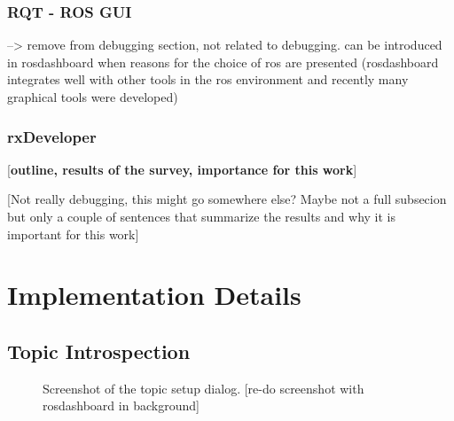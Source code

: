 \subsubsection{RQT - ROS GUI}
--> remove from debugging section, not related to debugging. can be introduced in rosdashboard when reasons for the choice of ros are presented (rosdashboard integrates well with other tools in the ros environment and recently many graphical tools were developed)

\subsubsection{rxDeveloper}
[\textbf{outline, results of the survey, importance for this work}]
\cite{Muellers2012}

[Not really debugging, this might go somewhere else? Maybe not a full subsecion but only a couple of sentences that summarize the results and why it is important for this work]

\section{Implementation Details}

\subsection{Topic Introspection}

\begin{figure}[thpb]
  \centering
  \caption{Screenshot of the topic setup dialog. [re-do screenshot with rosdashboard in background]}
  \label{topic setup screenshot}
\end{figure}

